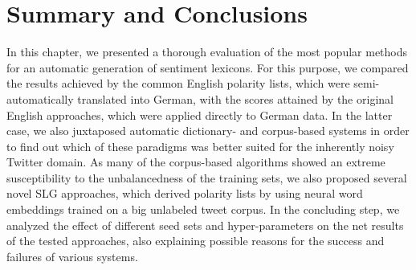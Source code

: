 
\section{Summary and Conclusions}

In this chapter, we presented a thorough evaluation of the most
popular methods for an automatic generation of sentiment lexicons.
For this purpose, we compared the results achieved by the common
English polarity lists, which were semi-automatically translated into
German, with the scores attained by the original English approaches,
which were applied directly to German data.  In the latter case, we
also juxtaposed automatic dictionary- and corpus-based systems in
order to find out which of these paradigms was better suited for the
inherently noisy Twitter domain.  As many of the corpus-based
algorithms showed an extreme susceptibility to the unbalancedness of
the training sets, we also proposed several novel SLG approaches,
which derived polarity lists by using neural word embeddings trained
on a big unlabeled tweet corpus.  In the concluding step, we analyzed
the effect of different seed sets and hyper-parameters on the net
results of the tested approaches, also explaining possible reasons for
the success and failures of various systems.

